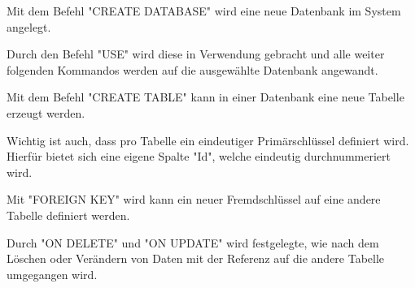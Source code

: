 

Mit dem Befehl "CREATE DATABASE" wird eine neue Datenbank im System angelegt.

Durch den Befehl "USE" wird diese in Verwendung gebracht und alle weiter folgenden Kommandos werden auf die ausgewählte Datenbank angewandt.


Mit dem Befehl "CREATE TABLE" kann in einer Datenbank eine neue Tabelle erzeugt werden.

Wichtig ist auch, dass pro Tabelle ein eindeutiger Primärschlüssel definiert wird. Hierfür bietet sich eine eigene Spalte "Id", welche eindeutig durchnummeriert wird.


Mit "FOREIGN KEY" wird kann ein neuer Fremdschlüssel auf eine andere Tabelle definiert werden.

Durch "ON DELETE" und "ON UPDATE" wird festgelegte, wie nach dem Löschen oder Verändern von Daten mit der Referenz auf die andere Tabelle umgegangen wird.

